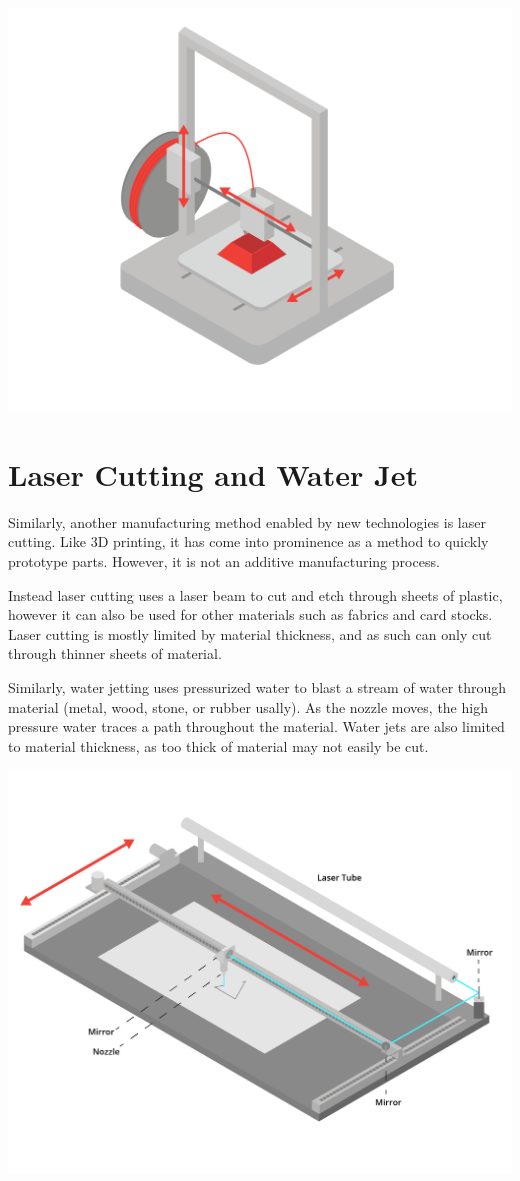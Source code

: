 \begin{center}
    
    \includegraphics[width=.75\textwidth]{3dprinter.png}
\end{center}

\section{Laser Cutting and Water Jet}

Similarly, another manufacturing method enabled by new technologies is laser cutting. Like 3D printing, it has come into prominence as a method to quickly prototype parts. However, it is not an additive manufacturing process.

Instead laser cutting uses a laser beam to cut and etch through sheets of plastic, however it can also be used for other materials such as fabrics and card stocks. Laser cutting is mostly limited by material thickness, and as such can only cut through thinner sheets of material.

Similarly, water jetting uses pressurized water to blast a stream of water through material (metal, wood, stone, or rubber usally). As the nozzle moves, the high pressure water traces a path throughout the material. Water jets are also limited to material thickness, as too thick of material may not easily be cut.

\begin{center}
    
    \includegraphics[width=.75\textwidth]{laserCutter.png}
\end{center}
